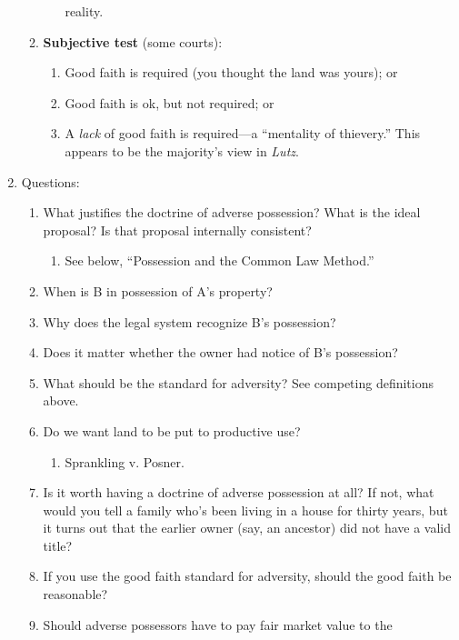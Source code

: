 \begin{enumerate}
\begin{enumerate}
\begin{enumerate}
            reality.
        \end{enumerate}
        \item \textbf{Subjective test} (some courts):
        \begin{enumerate}
            \item Good faith is required (you thought the land was yours); or
            \item Good faith is ok, but not required; or
            \item A \emph{lack} of good faith is required---a ``mentality of 
            thievery.'' This appears to be the majority's view in \emph{Lutz}.
        \end{enumerate}
    \end{enumerate}
    \item Questions:
    \begin{enumerate}
        \item What justifies the doctrine of adverse possession? What is the 
        ideal proposal? Is that proposal internally consistent?
        \begin{enumerate}
            \item See below, ``Possession and the Common Law Method.''
        \end{enumerate}
        \item When is B in possession of A's property?
        \item Why does the legal system recognize B's possession?
        \item Does it matter whether the owner had notice of B's possession?
        \item What should be the standard for adversity? See competing 
        definitions above.
        \item Do we want land to be put to productive use?
        \begin{enumerate}
            \item Sprankling v. Posner.
        \end{enumerate}
        \item Is it worth having a doctrine of adverse possession at all? If 
        not, what would you tell a family who's been living in a house for 
        thirty years, but it turns out that the earlier owner (say, an 
        ancestor) did not have a valid title?
        \item If you use the good faith standard for adversity, should the 
        good faith be reasonable?
        \item Should adverse possessors have to pay fair market value to the 

\end{enumerate}
\end{enumerate}
